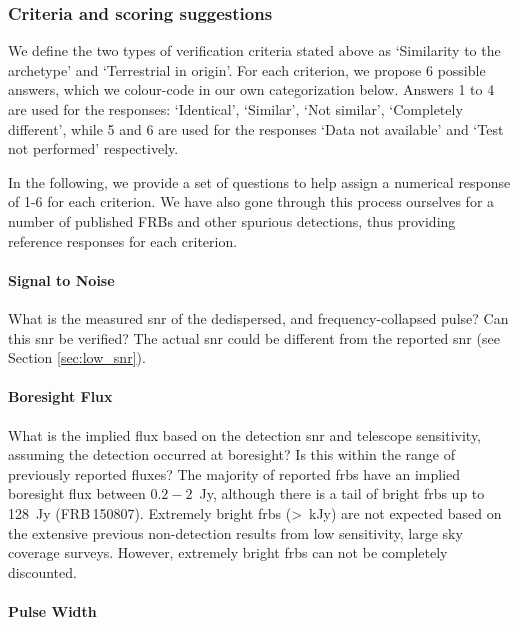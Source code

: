 \documentclass[a4paper,fleqn,usenatbib]{mnras}
\begin{document}
\subsubsection{Criteria and scoring suggestions}

We define the two types of verification criteria stated above as `Similarity to
the archetype' and `Terrestrial in origin'. For each criterion, we propose 6
possible answers, which we colour-code in our own categorization below. Answers
1 to 4 are used for the responses: `Identical', `Similar', `Not similar',
`Completely different', while 5 and 6 are used for the responses `Data not
available' and `Test not performed' respectively.

In the following, we provide a set of questions to help assign a numerical
response of 1-6 for each criterion. We have also gone through this process
ourselves for a number of published FRBs and other spurious detections, thus
providing reference responses for each criterion.  

\paragraph{Signal to Noise}

What is the measured \gls{snr} of the dedispersed, and frequency-collapsed
pulse? Can this \gls{snr} be verified? The actual \gls{snr} could be different
from the reported \gls{snr} (see Section \ref{sec:low_snr}).


\paragraph{Boresight Flux}

What is the implied flux based on the detection \gls{snr} and telescope
sensitivity, assuming the detection occurred at boresight? Is this within the
range of previously reported fluxes? The majority of reported \glspl{frb} have
an implied boresight flux between $0.2-2$~Jy, although there is a tail of bright
\glspl{frb} up to 128~Jy (FRB\,150807). Extremely bright \glspl{frb} (>~kJy) are
not expected based on the extensive previous non-detection results from low
sensitivity, large sky coverage surveys. However, extremely bright \glspl{frb}
can not be completely discounted.

\paragraph{Pulse Width}
\end{document}
